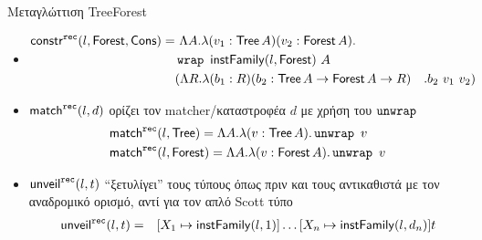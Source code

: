 \documentclass[10pt]{beamer}
\begin{document}
\begin{frame}{Μεταγλώττιση TreeForest}
\begin{itemize}
  \item[]
  \begin{align*}
  \constrRec{l}{\Forest}{\CCons} =&\ \Lambda A . \lambda (v_1 : \Tree A) (v_2 : \Forest A) .  \\
&\wrap\ \dtInstFinal{l}{\Forest}\ A\\
 &(\Lambda R . \lambda (b_1 : R) (b_2 : \Tree A \rightarrow \Forest A \rightarrow R) &. b_2\ v_1\ v_2)
  \end{align*}

  \item $\matchRec{l}{d}$ ορίζει τον matcher/καταστροφέα $d$ με χρήση του $\unwrap$
    \begin{align*}
    &\matchRec{l}{\Tree} = \Lambda A . \lambda (v : \Tree A) . \unwrap\ v\\
    &\matchRec{l}{\Forest} = \Lambda A . \lambda (v : \Forest A) . \unwrap\ v
    \end{align*}
  \item $\unveilRec{l}{t}$ ``ξετυλίγει'' τους τύπους όπως πριν
  και τους αντικαθιστά με τον αναδρομικό ορισμό, αντί για τον απλό
  Scott τύπο
    \begin{align*}
   \unveilRec{l}{t}
  &=& \subst{X_1}{\dtInstFinal{l}{1}}{\dots \subst{X_n}{\dtInstFinal{l}{d_n}}{t}} \\
    \end{align*}


\end{itemize}

\end{frame}
\end{document}
